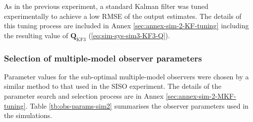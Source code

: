 As in the previous experiment, a standard Kalman filter was tuned experimentally to achieve a low \gls{RMSE} of the output estimates. The details of this tuning process are included in Annex \ref{sec:annex-sim-2-KF-tuning} including the resulting value of $\mathbf{Q}_{\text{KF3}}$ (\ref{eq:sim-sys-sim3-KF3-Q}).


\subsubsection{Selection of multiple-model observer parameters}

Parameter values for the sub-optimal multiple-model observers were chosen by a similar method to that used in the SISO experiment. The details of the parameter search and selection process are in Annex \ref{sec:annex-sim-2-MKF-tuning}. Table \ref{tb:obs-params-sim2} summarises the observer parameters used in the simulations.
